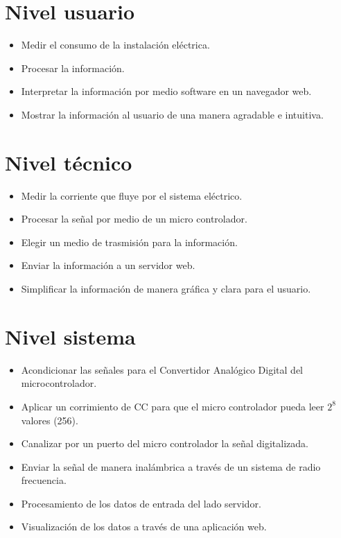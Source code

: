 \section*{ Nivel usuario }

\begin{itemize}

\item Medir el consumo de la instalación eléctrica.
\item Procesar la información.
\item Interpretar la información por medio software en un navegador web.
\item Mostrar la información al usuario de una manera agradable e intuitiva.
\end{itemize}

\section*{ Nivel técnico }

\begin{itemize} 

\item Medir la corriente que fluye por el sistema eléctrico.
\item Procesar la señal por medio de un micro controlador.
\item Elegir un medio de trasmisión para la información.
\item Enviar la información a un servidor web.
\item Simplificar la información de manera gráfica y clara para el usuario.

\end{itemize}


\section*{Nivel sistema}

\begin{itemize} %

\item Acondicionar las señales para el Convertidor Analógico Digital del microcontrolador.
\item Aplicar un corrimiento de \gls{CC} para que el micro controlador pueda leer $2^8$ valores (256).
\item Canalizar por un puerto del micro controlador la señal digitalizada.
\item Enviar la señal de manera inalámbrica a través de un sistema de radio frecuencia.
\item Procesamiento de los datos de entrada del lado servidor.
\item Visualización de los datos a través de una aplicación web.
\end{itemize}




